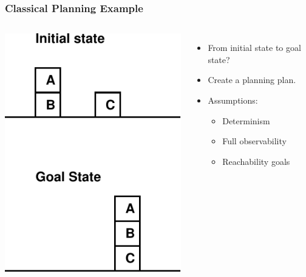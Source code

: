 \documentclass{beamer}
\let\origframetitle=\frametitle
\renewcommand\frametitle[1]{\origframetitle{\textbf{\large{\textrm{#1}}}}}
\begin{document}
\begin{frame}
  \frametitle{Classical Planning Example}

  \begin{columns}
    \includegraphics[width=\textwidth]{../presentation-plan/blocksworld.pdf}


    \begin{itemize}
      \item From initial state to goal state?
      \item Create a planning plan.
      \item Assumptions:
        \begin{itemize}
          \item Determinism
          \item Full observability
          \item Reachability goals
        \end{itemize}
    \end{itemize}
  \end{columns}

\end{frame}
\end{document}
